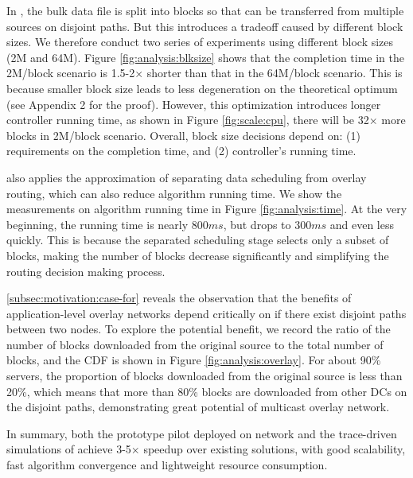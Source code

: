 
 In \name, the bulk data file is split into blocks so that can be transferred from multiple sources on disjoint paths. But this introduces a tradeoff caused by different block sizes. We therefore conduct two series of experiments using different block sizes (2M and 64M). Figure \ref{fig:analysis:blksize} shows that the completion time in the 2M/block scenario is 1.5-2$\times$ shorter than that in the 64M/block scenario. This is because smaller block size leads to less degeneration on the theoretical optimum (see Appendix 2 for the proof). However, this optimization introduces longer controller running time, as shown in Figure \ref{fig:scale:cpu}, there will be 32$\times$ more blocks in 2M/block scenario. Overall, block size decisions depend on: (1) requirements on the completion time, and (2) controller's running time.

 \name also applies the approximation of separating data scheduling from overlay routing, which can also reduce algorithm running time. We show the measurements on algorithm running time in Figure \ref{fig:analysis:time}. At the very beginning, the running time is nearly $800ms$, but drops to $300ms$ and even less quickly. This is because the separated scheduling stage selects only a subset of blocks, making the number of blocks decrease significantly and simplifying the routing decision making process.

 \Section\ref{subsec:motivation:case-for} reveals the observation that the benefits of application-level overlay networks depend critically on if there exist disjoint paths between two nodes. To explore the potential benefit, we record the ratio of the number of blocks downloaded from the original source to the total number of blocks, and the CDF is shown in Figure \ref{fig:analysis:overlay}. For about 90\% servers, the proportion of blocks downloaded from the original source is less than 20\%, which means that more than 80\% blocks are downloaded from other DCs on the disjoint paths, demonstrating great potential of multicast overlay network.

In summary, both the prototype pilot deployed on \company network and the trace-driven simulations of \name achieve 3-5$\times$ speedup over existing solutions, with good scalability, fast algorithm convergence and lightweight resource consumption.


